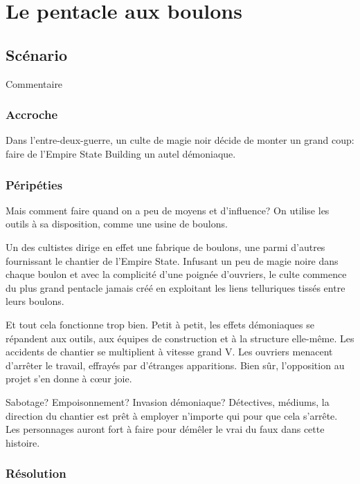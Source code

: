 \chapter{Le pentacle aux boulons}

\section{Scénario}

Commentaire

\subsection{Accroche}

Dans l'entre-deux-guerre, un culte de magie noir décide de monter un grand coup: faire de l'Empire State Building un autel démoniaque.

\subsection{Péripéties}

Mais comment faire quand on a peu de moyens et d'influence? On utilise les outils à sa disposition, comme une usine de boulons.

Un des cultistes dirige en effet une fabrique de boulons, une parmi d'autres fournissant le chantier de l'Empire State. Infusant un peu de magie noire dans chaque boulon et avec la complicité d'une poignée d'ouvriers, le culte commence du plus grand pentacle jamais créé en exploitant les liens telluriques tissés entre leurs boulons.

Et tout cela fonctionne trop bien. Petit à petit, les effets démoniaques se répandent aux outils, aux équipes de construction et à la structure elle-même. Les accidents de chantier se multiplient à vitesse grand V. Les ouvriers menacent d'arrêter le travail, effrayés par d'étranges apparitions. Bien sûr, l'opposition au projet s'en donne à cœur joie.

Sabotage? Empoisonnement? Invasion démoniaque? Détectives, médiums, la direction du chantier est prêt à employer n'importe qui pour que cela s'arrête. Les personnages auront fort à faire pour démêler le vrai du faux dans cette histoire.

\subsection{Résolution}
